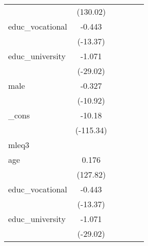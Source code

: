 {\begin{tabular}{l*{5}{c}}
            &    (130.02)         &                     &                     &                     &                     \\
[1em]
educ\_vocational&      -0.443\sym{***}&                     &                     &                     &                     \\
            &    (-13.37)         &                     &                     &                     &                     \\
[1em]
educ\_university&      -1.071\sym{***}&                     &                     &                     &                     \\
            &    (-29.02)         &                     &                     &                     &                     \\
[1em]
male        &      -0.327\sym{***}&                     &                     &                     &                     \\
            &    (-10.92)         &                     &                     &                     &                     \\
[1em]
\_cons      &      -10.18\sym{***}&                     &                     &                     &                     \\
            &   (-115.34)         &                     &                     &                     &                     \\
\hline
mleq3       &                     &                     &                     &                     &                     \\
age         &       0.176\sym{***}&                     &                     &                     &                     \\
            &    (127.82)         &                     &                     &                     &                     \\
[1em]
educ\_vocational&      -0.443\sym{***}&                     &                     &                     &                     \\
            &    (-13.37)         &                     &                     &                     &                     \\
[1em]
educ\_university&      -1.071\sym{***}&                     &                     &                     &                     \\
            &    (-29.02)         &                     &                     &                     &                     \\

\end{tabular}}
